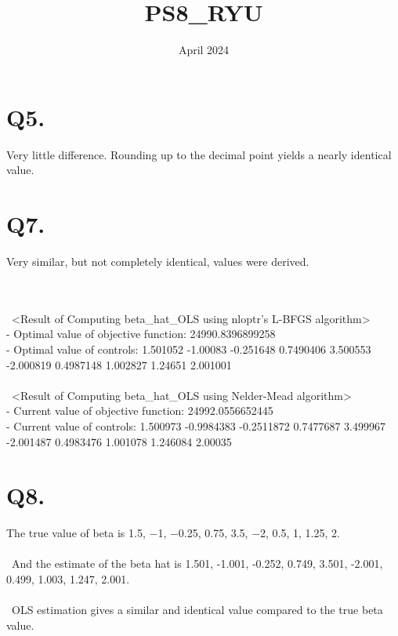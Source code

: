 \documentclass{article}
\title{PS8\_RYU}
\date{April 2024}
\begin{document}
\maketitle

\section{Q5.}
\large{Very little difference. Rounding up to the decimal point yields a nearly identical value.}


\section{Q7.}
Very similar, but not completely identical, values were derived.

\\\
\\\
<Result of Computing beta\_hat\_OLS using nloptr's L-BFGS algorithm>
\\
- Optimal value of objective function:  24990.8396899258 
\\
- Optimal value of controls: 1.501052 -1.00083 -0.251648 0.7490406 3.500553 -2.000819 0.4987148 1.002827 1.24651 2.001001
\\\
\\\
<Result of Computing beta\_hat\_OLS using Nelder-Mead algorithm>
\\
- Current value of objective function:  24992.0556652445 
\\
- Current value of controls: 1.500973 -0.9984383 -0.2511872 0.7477687 3.499967 -2.001487 0.4983476 1.001078 1.246084 2.00035

\section{Q8.}
The true value of beta is 1.5,  −1,  −0.25,  0.75,  3.5,  −2,  0.5,  1,  1.25,  2.
\\\
\\\
And the estimate of the beta hat is 1.501,  -1.001, -0.252,  0.749,  3.501,  -2.001,  0.499,  1.003,  1.247,  2.001.
\\\
\\\
OLS estimation gives a similar and identical value compared to the true beta value.
\end{document}
